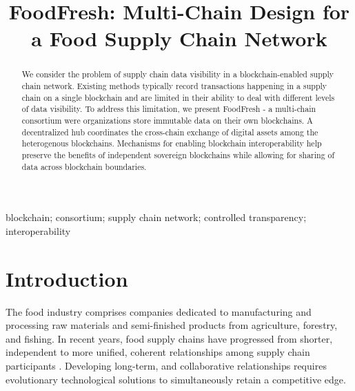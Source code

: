 \documentclass[conference]{IEEEtran}
\begin{document}
\title{FoodFresh: Multi-Chain Design for a Food Supply Chain Network}

\maketitle

\begin{abstract}
We consider the problem of supply chain data visibility in a blockchain-enabled supply chain network. Existing methods typically record transactions happening in a supply chain on a single blockchain and are limited in their ability to deal with different levels of data visibility.
To address this limitation, we present FoodFresh - a multi-chain consortium were organizations store immutable data on their own blockchains. A decentralized hub coordinates the cross-chain exchange of digital assets among the heterogenous blockchains.  
Mechanisms for enabling blockchain interoperability help preserve the benefits of independent sovereign blockchains while allowing for sharing of data across blockchain boundaries.
\end{abstract}

\begin{IEEEkeywords}
blockchain; consortium; supply chain network; controlled transparency; interoperability
\end{IEEEkeywords}

\section{Introduction} \label{s:introduction}
The food industry comprises companies dedicated to manufacturing and processing raw materials and semi-finished products from agriculture, forestry, and fishing. In recent years, food supply chains have progressed from shorter, independent to more unified, coherent relationships among supply chain participants \cite{bourlakis2008food}. Developing long-term, and collaborative relationships requires evolutionary technological solutions to simultaneously retain a competitive edge. 
\end{document}
